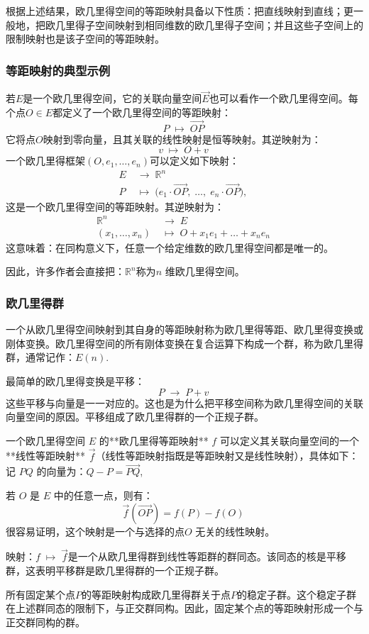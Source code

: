 根据上述结果，欧几里得空间的等距映射具备以下性质：把直线映射到直线；更一般地，把欧几里得子空间映射到相同维数的欧几里得子空间；并且这些子空间上的限制映射也是该子空间的等距映射。
\subsubsection{等距映射的典型示例}
若$E$是一个欧几里得空间，它的关联向量空间$\overrightarrow{E}$也可以看作一个欧几里得空间。每个点$O \in E$都定义了一个欧几里得空间的等距映射：
$$
P \;\mapsto\; \overrightarrow{OP}~
$$
它将点$O$映射到零向量，且其关联的线性映射是恒等映射。其逆映射为：
$$
v \;\mapsto\; O + v~
$$
一个欧几里得框架$(O, e_1, \dots, e_n)$可以定义如下映射：
$$
\begin{aligned}
E &\;\to\; \mathbb{R}^n \\
P &\;\mapsto\; 
\bigl( e_1 \cdot \overrightarrow{OP}, \; \dots, \; e_n \cdot \overrightarrow{OP} \bigr),
\end{aligned}~
$$
这是一个欧几里得空间的等距映射。其逆映射为：
$$
\begin{aligned}
\mathbb{R}^n &\;\to\; E \\
(x_1, \dots, x_n) &\;\mapsto\; 
O + x_1 e_1 + \dots + x_n e_n
\end{aligned}~
$$
这意味着：在同构意义下，任意一个给定维数的欧几里得空间都是唯一的。

因此，许多作者会直接把：$\mathbb{R}^n$称为$n$ 维欧几里得空间。
\subsubsection{欧几里得群}
一个从欧几里得空间映射到其自身的等距映射称为欧几里得等距、欧几里得变换或刚体变换。欧几里得空间的所有刚体变换在复合运算下构成一个群，称为欧几里得群，通常记作：$E(n)$.

最简单的欧几里得变换是平移：
$$
P \;\to\; P + v~
$$
这些平移与向量是一一对应的。这也是为什么把平移空间称为欧几里得空间的关联向量空间的原因。平移组成了欧几里得群的一个正规子群。

一个欧几里得空间 $E$ 的**欧几里得等距映射** $f$ 可以定义其关联向量空间的一个**线性等距映射** $\overrightarrow{f}$（线性等距映射指既是等距映射又是线性映射），具体如下：记 $P Q$ 的向量为：$Q - P = \overrightarrow{PQ}$,

若 $O$ 是 $E$ 中的任意一点，则有：
$$
\overrightarrow{f}(\overrightarrow{OP}) = f(P) - f(O)~
$$
很容易证明，这个映射是一个与选择的点$O$ 无关的线性映射。

映射：$f \;\longmapsto\; \overrightarrow{f}$是一个从欧几里得群到线性等距群的群同态。该同态的核是平移群，这表明平移群是欧几里得群的一个正规子群。

所有固定某个点$P$的等距映射构成欧几里得群关于点$P$的稳定子群。这个稳定子群在上述群同态的限制下，与正交群同构。因此，固定某个点的等距映射形成一个与正交群同构的群。

